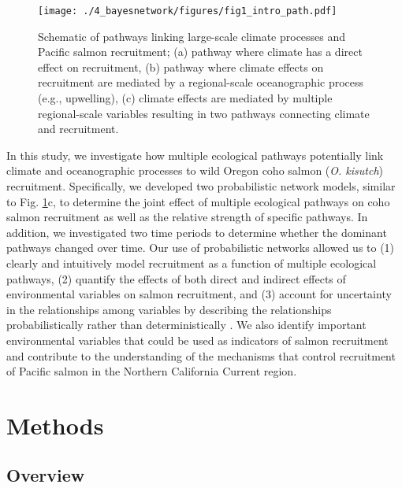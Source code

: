 \begin{figure}[htbp]
  \centering \texttt{[image: ./4\_bayesnetwork/figures/fig1\_intro\_path.pdf]}
  \caption[Schematic of pathways linking large-scale climate processes and
           Pacific salmon recruitment.]{Schematic of pathways linking
           large-scale climate processes and Pacific salmon recruitment; (a)
           pathway where climate has a direct effect on recruitment, (b) pathway
           where climate effects on recruitment are mediated by a regional-scale
           oceanographic process (e.g., upwelling), (c) climate effects are
           mediated by multiple regional-scale variables resulting in two
           pathways connecting climate and recruitment.}
  \label{fig:bn:1}
\end{figure}

In this study, we investigate how multiple ecological pathways potentially link
climate and oceanographic processes to wild Oregon coho salmon (\emph{O.
kisutch}) recruitment. Specifically, we developed two probabilistic network
models, similar to Fig. \ref{fig:bn:1}c, to determine the joint effect of
multiple ecological pathways on coho salmon recruitment as well as the relative
strength of specific pathways. In addition, we investigated two time periods to
determine whether the dominant pathways changed over time. Our use of
probabilistic networks allowed us to (1) clearly and intuitively model
recruitment as a function of multiple ecological pathways, (2) quantify the
effects of both direct and indirect effects of environmental variables on salmon
recruitment, and (3) account for uncertainty in the relationships among
variables by describing the relationships probabilistically rather than
deterministically \citep{Varis1995a}. We also identify important environmental
variables that could be used as indicators of salmon recruitment and contribute
to the understanding of the mechanisms that control recruitment of Pacific
salmon in the Northern California Current region.



\section{Methods}

\subsection{Overview}

